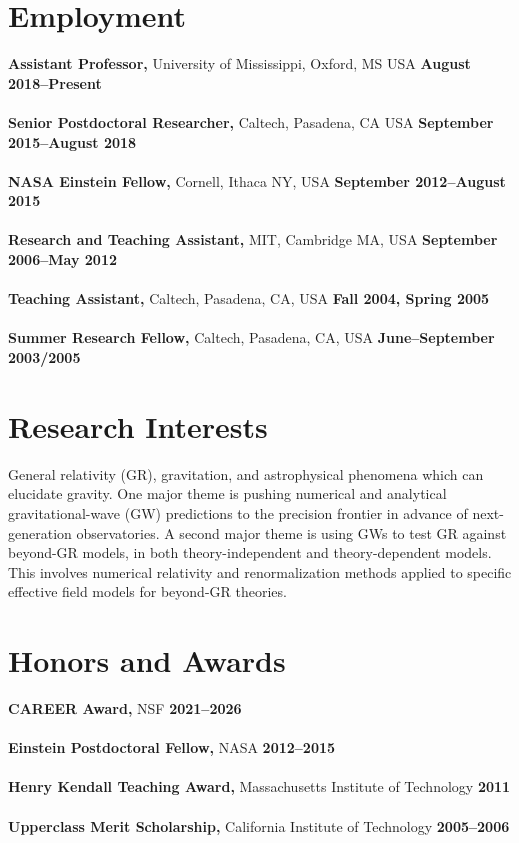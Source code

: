 \documentclass[margin,line]{res}
\begin{document}
\begin{resume}
\section{\sc Employment}
{\bf Assistant Professor,} University of Mississippi, Oxford, MS USA
\hfill {\bf August 2018--Present}\\
\\
{\bf Senior Postdoctoral Researcher,} Caltech, Pasadena, CA USA
\hfill {\bf September 2015--August 2018}\\
\\
{\bf NASA Einstein Fellow,} Cornell, Ithaca NY, USA
\hfill {\bf September 2012--August 2015}\\
\\
{\bf Research and Teaching Assistant,} MIT, Cambridge MA, USA \hfill {\bf September 2006--May 2012}\\
\\
{\bf Teaching Assistant,} Caltech, Pasadena, CA, USA \hfill {\bf  Fall 2004, Spring 2005}\\
\\
{\bf Summer Research Fellow,} Caltech, Pasadena, CA, USA \hfill {\bf  June--September 2003/2005}\\

\vspace{-1em}

\section{\sc Research Interests}
General relativity (GR), gravitation, and astrophysical phenomena which can
elucidate gravity.
One major theme is pushing numerical and analytical gravitational-wave
(GW) predictions to the precision frontier in advance of
next-generation observatories.
A second major theme is using GWs to test GR against beyond-GR
models, in both theory-independent and theory-dependent models.
This involves numerical relativity and renormalization methods
applied to specific effective field models for beyond-GR theories.

\section{\sc Honors and Awards}
{\bf CAREER Award,} NSF \hfill {\bf 2021--2026}\\
\\
{\bf Einstein Postdoctoral Fellow,} NASA \hfill {\bf 2012--2015}\\
\\
{\bf Henry Kendall Teaching Award,} Massachusetts Institute of Technology \hfill {\bf 2011}\\
\\
{\bf Upperclass Merit Scholarship,} California Institute of Technology \hfill {\bf 2005--2006}\\


\end{resume}
\end{document}
